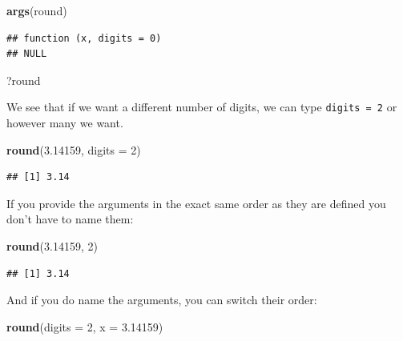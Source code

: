 \documentclass[]{book}
\newenvironment{Shaded}{\begin{snugshade}}{\end{snugshade}}
\newcommand{\DataTypeTok}[1]{\textcolor[rgb]{0.13,0.29,0.53}{#1}}
\newcommand{\DecValTok}[1]{\textcolor[rgb]{0.00,0.00,0.81}{#1}}
\newcommand{\FloatTok}[1]{\textcolor[rgb]{0.00,0.00,0.81}{#1}}
\newcommand{\KeywordTok}[1]{\textcolor[rgb]{0.13,0.29,0.53}{\textbf{#1}}}
\newcommand{\NormalTok}[1]{#1}
\begin{document}
\begin{Shaded}
\begin{Highlighting}[]
\KeywordTok{args}\NormalTok{(round)}
\end{Highlighting}
\end{Shaded}

\begin{verbatim}
## function (x, digits = 0) 
## NULL
\end{verbatim}

\begin{Shaded}
\begin{Highlighting}[]
\NormalTok{?round}
\end{Highlighting}
\end{Shaded}

We see that if we want a different number of digits, we can type \texttt{digits\ =\ 2} or however many we want.

\begin{Shaded}
\begin{Highlighting}[]
\KeywordTok{round}\NormalTok{(}\FloatTok{3.14159}\NormalTok{, }\DataTypeTok{digits =} \DecValTok{2}\NormalTok{)}
\end{Highlighting}
\end{Shaded}

\begin{verbatim}
## [1] 3.14
\end{verbatim}

If you provide the arguments in the exact same order as they are defined you don't have to name them:

\begin{Shaded}
\begin{Highlighting}[]
\KeywordTok{round}\NormalTok{(}\FloatTok{3.14159}\NormalTok{, }\DecValTok{2}\NormalTok{)}
\end{Highlighting}
\end{Shaded}

\begin{verbatim}
## [1] 3.14
\end{verbatim}

And if you do name the arguments, you can switch their order:

\begin{Shaded}
\begin{Highlighting}[]
\KeywordTok{round}\NormalTok{(}\DataTypeTok{digits =} \DecValTok{2}\NormalTok{, }\DataTypeTok{x =} \FloatTok{3.14159}\NormalTok{)}
\end{Highlighting}
\end{Shaded}
\end{document}
